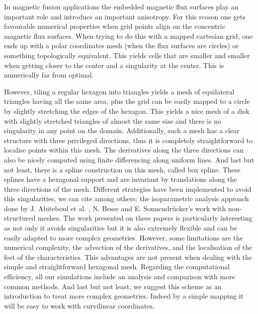 \documentclass[proc]{edpsmath}
\begin{document}
In magnetic fusion applications the embedded magnetic flux surfaces play an important role and introduce an important anisotropy\cite{Angelino2009}. For this reason one gets favourable numerical properties when grid points align on the concentric magnetic flux surfaces. When trying to do this with a mapped cartesian grid, one ends up with a polar coordinates mesh (when the flux surfaces are circles) or something topologically equivalent. This yields cells that are smaller and smaller when getting closer to the center and a singularity at the center. This is numerically far from optimal. 

However, tiling a regular hexagon into triangles yields a mesh of equilateral triangles having all the same area, plus the grid can be easily mapped to a circle by slightly stretching the edges of the hexagon. This yields a nice mesh of a disk with slightly stretched triangles of almost the same size and there is no singularity in any point on the domain. 
Additionally, such a mesh has a clear structure with three privileged directions, thus it is completely straightforward to localise points within this mesh. The derivatives along the three directions can also be nicely computed using finite differencing along uniform lines. And last but not least, there is a spline construction on this mesh, called box spline. These splines have a hexagonal support and are invariant by translations along the three directions of the mesh. Different strategies have been implemented to avoid this singularities, we can cite among others: the isoparametric analysis approach done by J. Abiteboul et al. \cite{abiteboul2011solving}, N. Besse and E. Sonnendr\"{u}cker's work with non-structured meshes\cite{Besse2003341}. The work presented on these papers is particularly interesting as not only it avoids singularities but it is also extremely flexible and can be easily adapted to more complex geometries. However, some limitations are the numerical complexity, the advection of the derivatives, and the localisation of the feet of the characteristics. This advantages are not present when dealing with the simple and straightforward hexagonal mesh. Regarding the computational efficiency, all our simulations include an analysis and comparison with more common methods. And last but not least, we suggest this scheme as an introduction to treat more complex geometries. Indeed by a simple mapping it will be easy to work with curvilinear coordinates.
\end{document}
